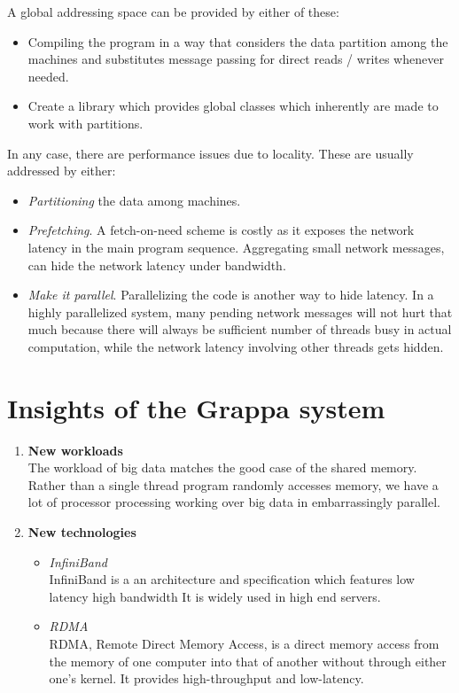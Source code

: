 \documentclass[twoside]{article}
\begin{document}
A global addressing space can be provided by either of these:

\begin{itemize}
\item Compiling the program in a way that considers the data partition among the
  machines and substitutes message passing for direct reads / writes whenever
  needed.
\item Create a library which provides global classes which inherently are made
  to work with partitions.
\end{itemize}


In any case, there are performance issues due to locality. These are usually
addressed by either:
\begin{itemize}
\item {\sl Partitioning} the data among machines.
\item {\sl Prefetching}. A fetch-on-need scheme is costly as it exposes the
  network latency in the main program sequence. Aggregating small network
  messages, can hide the network latency under bandwidth.
\item {\sl Make it parallel}. Parallelizing the code is another way to hide
  latency. In a highly parallelized system, many pending network messages will
  not hurt that much because there will always be sufficient number of threads
  busy in actual computation, while the network latency involving other threads
  gets hidden.
\end{itemize}
\section{Insights of the Grappa system}
\begin{enumerate}
\item {\bf New workloads}\\
The workload of big data matches the good case of the shared memory. Rather than
a single thread program randomly accesses memory, we have a lot of processor
processing working over big data in embarrassingly parallel.
\item {\bf New technologies}
\begin{itemize}
\item {\sl InfiniBand}\\
InfiniBand is a  an architecture and specification which features low latency
high bandwidth It is widely used in high end servers.
\item {\sl RDMA}\\
RDMA, Remote Direct Memory Access, is a direct memory access from the memory of
one computer into that of another without through either one's kernel. It
provides high-throughput and low-latency.
\end{itemize}
\end{enumerate}
\end{document}
